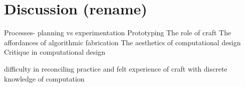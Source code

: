 \chapter{Discussion (rename)}

	Processes- planning vs experimentation
	Prototyping
	The role of craft
	The affordances of algorithmic fabrication
	The aesthetics of computational design
	Critique in computational design
	
	difficulty in reconciling practice and felt experience of craft with discrete knowledge of computation
